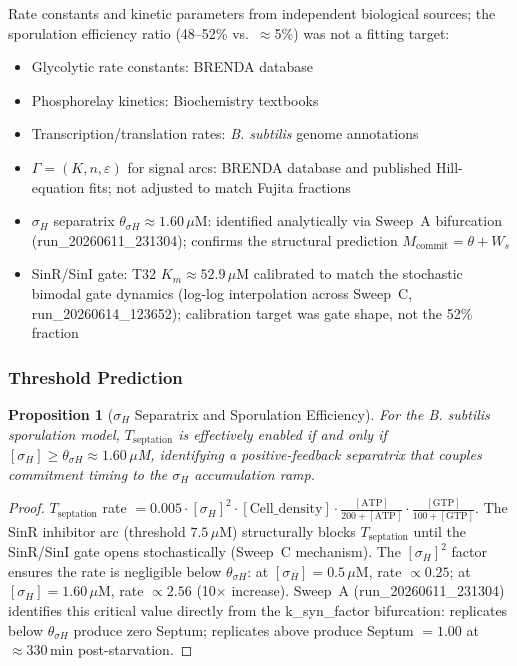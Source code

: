 \documentclass[10pt,letterpaper]{article}
\newtheorem{proposition}{Proposition}
\begin{document}
Rate constants and kinetic parameters from independent biological sources; the sporulation efficiency ratio (48--52\% vs.\ $\approx$5\%) was not a fitting target:
\begin{itemize}
\item Glycolytic rate constants: BRENDA database~\cite{schomburg2004}
\item Phosphorelay kinetics: Biochemistry textbooks~\cite{voet2016}
\item Transcription/translation rates: \textit{B. subtilis} genome annotations~\cite{barbe2009}
\item $\Gamma = (K, n, \varepsilon)$ for signal arcs: BRENDA database and published Hill-equation fits; not adjusted to match Fujita fractions
\item $\sigma_H$ separatrix $\theta_{\sigma H} \approx 1.60\,\mu$M: identified analytically via Sweep~A bifurcation (run\_20260611\_231304); confirms the structural prediction $M_{\text{commit}} = \theta + W_s$
\item SinR/SinI gate: T32 $K_m \approx 52.9\,\mu$M calibrated to match the stochastic bimodal gate dynamics (log-log interpolation across Sweep~C, run\_20260614\_123652); calibration target was gate shape, not the 52\% fraction
\end{itemize}

\subsubsection{Threshold Prediction}

\begin{proposition}[$\sigma_H$ Separatrix and Sporulation Efficiency]
\label{prop:sigmaH_separatrix}
For the \textit{B. subtilis} sporulation model, $T_{\mathrm{septation}}$ is effectively enabled if and only if $[\sigma_H] \geq \theta_{\sigma H} \approx 1.60\,\mu$M, identifying a positive-feedback separatrix that couples commitment timing to the $\sigma_H$ accumulation ramp.
\end{proposition}

\begin{proof}
$T_{\mathrm{septation}}$ rate $= 0.005 \cdot [\sigma_H]^2 \cdot [\text{Cell\_density}] \cdot \frac{[\text{ATP}]}{200 + [\text{ATP}]} \cdot \frac{[\text{GTP}]}{100 + [\text{GTP}]}$.
The SinR inhibitor arc (threshold $7.5\,\mu$M) structurally blocks $T_{\mathrm{septation}}$ until the SinR/SinI gate opens stochastically (Sweep~C mechanism). The $[\sigma_H]^2$ factor ensures the rate is negligible below $\theta_{\sigma H}$: at $[\sigma_H] = 0.5\,\mu$M, rate $\propto 0.25$; at $[\sigma_H] = 1.60\,\mu$M, rate $\propto 2.56$ (10$\times$ increase). Sweep~A (run\_20260611\_231304) identifies this critical value directly from the k\_syn\_factor bifurcation: replicates below $\theta_{\sigma H}$ produce zero Septum; replicates above produce Septum $= 1.00$ at $\approx 330\,\text{min}$ post-starvation.
\end{proof}
\end{document}

